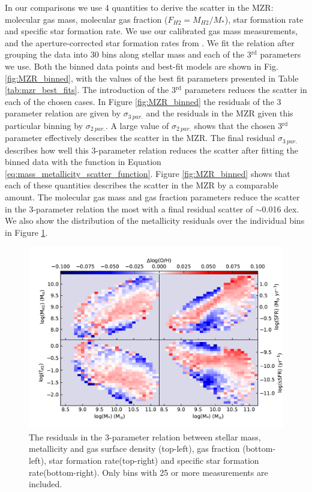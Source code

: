 \documentclass[fleqn,usenatbib]{mnras}
\begin{document}
In our comparisons we use 4 quantities to derive the scatter in the MZR: molecular gas mass, molecular gas fraction ($F_{H2} = M_{H2}/M_{*}$), star formation rate and specific star formation rate. We use our calibrated gas mass measurements, and the aperture-corrected star formation rates from \cite{brinchmann2004}. We fit the relation after grouping the data into 30 bins along stellar mass and each of the 3$^{\textrm{rd}}$ parameters we use. Both the binned data points and best-fit models are shown in Fig. \ref{fig:MZR_binned}, with the values of the best fit parameters presented in Table \ref{tab:mzr_best_fits}. The introduction of the 3$^{\textrm{rd}}$ parameters reduces the scatter in each of the chosen cases. In Figure \ref{fig:MZR_binned} the residuals of the 3 parameter relation are given by $\sigma_{3\: par.}$ and the residuals in the MZR given this particular binning by $\sigma_{2\: par.}$. 
A large value of $\sigma_{2\: par.}$ shows that the chosen 3$^{\textrm{rd}}$ parameter effectively describes the scatter in the MZR. The final residual $\sigma_{3\: par.}$ describes how well this 3-parameter relation reduces the scatter after fitting the binned data with the function in Equation \ref{eq:mass_metallicity_scatter_function}. Figure \ref{fig:MZR_binned} shows that each of these quantities describes the scatter in the MZR by a comparable amount. The molecular gas mass and gas fraction parameters reduce the scatter in the 3-parameter relation the most with a final residual scatter of $\sim$0.016 dex. We also show the distribution of the metallicity residuals over the individual bins in Figure \ref{fig:MZR_binned_metallicity_residuals}. 

\begin{figure}
    \centering
    \includegraphics[width=2\columnwidth]{figures/fig12.pdf}
    \caption{The residuals in the 3-parameter relation between stellar mass, metallicity and gas surface density (top-left), gas fraction (bottom-left), star formation rate(top-right) and specific star formation rate(bottom-right). Only bins with 25 or more measurements are included.}
    \label{fig:MZR_binned_metallicity_residuals}
\end{figure}
\end{document}
